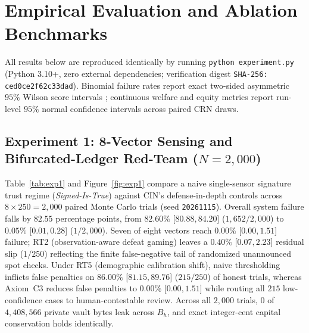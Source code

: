 \documentclass[11pt]{article}
\begin{document}
\section{Empirical Evaluation and Ablation Benchmarks}\label{sec:experiments}

All results below are reproduced identically by running \texttt{python experiment.py} (Python 3.10+, zero external dependencies; verification digest \texttt{SHA-256: ced0ce2f62c33dad}). Binomial failure rates report exact two-sided asymmetric $95\%$ Wilson score intervals \citep{wilson1927probable}; continuous welfare and equity metrics report run-level $95\%$ normal confidence intervals across paired CRN draws.

\subsection{Experiment 1: 8-Vector Sensing and Bifurcated-Ledger Red-Team ($N = 2{,}000$)}

Table~\ref{tab:exp1} and Figure~\ref{fig:exp1} compare a naive single-sensor signature trust regime (\emph{Signed-Is-True}) against CIN's defense-in-depth controls across $8 \times 250 = 2{,}000$ paired Monte Carlo trials (seed \texttt{20261115}). Overall system failure falls by $82.55$ percentage points, from $82.60\%$ [$80.88, 84.20$] ($1{,}652/2{,}000$) to $0.05\%$ [$0.01, 0.28$] ($1/2{,}000$). Seven of eight vectors reach $0.00\%$ [$0.00, 1.51$] failure; RT2 (observation-aware defeat gaming) leaves a $0.40\%$ [$0.07, 2.23$] residual slip ($1/250$) reflecting the finite false-negative tail of randomized unannounced spot checks. Under RT5 (demographic calibration shift), naive thresholding inflicts false penalties on $86.00\%$ [$81.15, 89.76$] ($215/250$) of honest trials, whereas Axiom~C3 reduces false penalties to $0.00\%$ [$0.00, 1.51$] while routing all $215$ low-confidence cases to human-contestable review. Across all $2{,}000$ trials, $0$ of $4{,}408{,}566$ private vault bytes leak across $B_h$, and exact integer-cent capital conservation holds identically.
\end{document}
